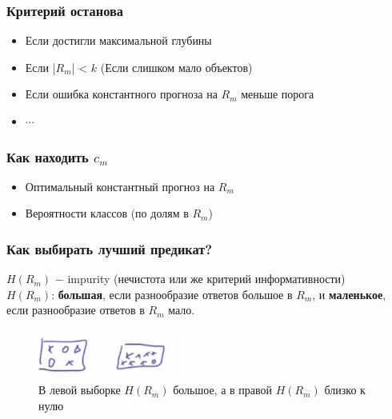             \subsubsection{Критерий останова}
                \begin{itemize}
                    \item Если достигли максимальной глубины

                    \item Если |$R_m$| < $k$ (Если слишком мало объектов)

                    \item Если ошибка константного прогноза на $R_m$ меньше порога

                    \item $\cdots$
                \end{itemize}


            \subsubsection{Как находить $c_m$}

                \begin{itemize}
                    \item Оптимальный константный прогноз на $R_m$

                    \item Вероятности классов (по долям в $R_m$)
                \end{itemize}

            \subsubsection{Как выбирать лучший предикат?}

                $H(R_m)$ $-$ impurity (нечистота или же критерий информативности)\\

                $H(R_m)$: \textbf{большая}, если разнообразие ответов большое в $R_m$, и \textbf{маленькое}, если разнообразие ответов в $R_m$ мало.
                
                \begin{figure}[H]
                    \centering
                    \includegraphics[width=0.4\textwidth]{images/8lecture/ImpuritySamples.png}
                    \caption{В левой выборке $H(R_m)$ большое, а в правой $H(R_m)$ близко к нулю}
                \end{figure}


